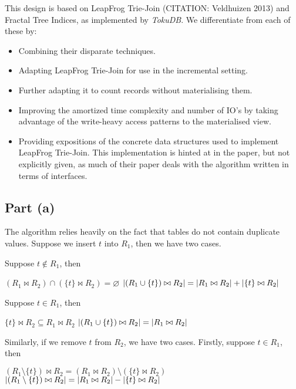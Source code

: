 This design is based on LeapFrog Trie-Join (CITATION: Veldhuizen 2013) and Fractal Tree Indices, as implemented by \textit{TokuDB}. We differentiate from each of these by:
\begin{itemize}
  \item Combining their disparate techniques.
  \item Adapting LeapFrog Trie-Join for use in the incremental setting.
  \item Further adapting it to count records without materialising them.
  \item Improving the amortized time complexity and number of IO's by taking advantage of the write-heavy access patterns to the materialised view.
  \item Providing expositions of the concrete data structures used to implement LeapFrog Trie-Join. This implementation is hinted at in the paper, but not explicitly given, as much of their paper deals with the algorithm written in terms of interfaces.
\end{itemize}

\subsection{Part (a)}\label{sec:q-1-a}
The algorithm relies heavily on the fact that tables do not contain duplicate values. Suppose we insert $t$ into $R_1$, then we have two cases.

Suppose $t\notin R_1$, then
\begin{itemize}
  \step[\imps] $(R_1\bowtie R_2)\cap(\{t\}\bowtie R_2) = \varnothing$
  \step[\imps] $\lvert(R_1\cup\{t\})\bowtie R_2\rvert = \lvert R_1\bowtie R_2\rvert + \lvert\{t\}\bowtie R_2\rvert$
\end{itemize}

Suppose $t\in R_1$, then
\begin{itemize}
  \step[\imps] $\{t\}\bowtie R_2\subseteq R_1\bowtie R_2$
  \step[\imps] $\lvert(R_1\cup\{t\})\bowtie R_2\rvert = \lvert R_1\bowtie R_2\rvert$
\end{itemize}

Similarly, if we remove $t$ from $R_2$, we have two cases. Firstly, suppose $t\in R_1$, then
\begin{itemize}
  \step[\imps] $(R_1\setminus\{t\})\bowtie R_2 = (R_1\bowtie R_2)\setminus(\{t\}\bowtie R_2)$
  \step[\imps] $\lvert(R_1\setminus\{t\})\bowtie R_2\rvert = \lvert R_1\bowtie R_2\rvert - \lvert\{t\}\bowtie R_2\rvert$
\end{itemize}

